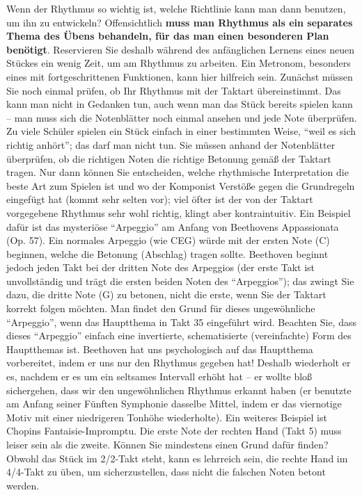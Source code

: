 Wenn der Rhythmus so wichtig ist, welche Richtlinie kann man dann benutzen, um ihn zu entwickeln?
Offensichtlich \textbf{muss man Rhythmus als ein separates Thema des Übens behandeln, für das man einen besonderen Plan benötigt}.
Reservieren Sie deshalb während des anfänglichen Lernens eines neuen Stückes ein wenig Zeit, um am Rhythmus zu arbeiten.
Ein Metronom, besonders eines mit fortgeschrittenen Funktionen, kann hier hilfreich sein.
Zunächst müssen Sie noch einmal prüfen, ob Ihr Rhythmus mit der Taktart übereinstimmt.
Das kann man nicht in Gedanken tun, auch wenn man das Stück bereits spielen kann -- man muss sich die Notenblätter noch einmal ansehen und jede Note überprüfen.
Zu viele Schüler spielen ein Stück einfach in einer bestimmten Weise, \enquote{weil es sich richtig anhört}; das darf man nicht tun.
Sie müssen anhand der Notenblätter überprüfen, ob die richtigen Noten die richtige Betonung gemäß der Taktart tragen.
Nur dann können Sie entscheiden, welche rhythmische Interpretation die beste Art zum Spielen ist und wo der Komponist Verstöße gegen die Grundregeln eingefügt hat (kommt sehr selten vor); viel öfter ist der von der Taktart vorgegebene Rhythmus sehr wohl richtig, klingt aber kontraintuitiv.
Ein Beispiel dafür ist das mysteriöse \enquote{Arpeggio} am Anfang von Beethovens Appassionata (Op. 57).
Ein normales Arpeggio (wie CEG) würde mit der ersten Note (C) beginnen, welche die Betonung (Abschlag) tragen sollte.
Beethoven beginnt jedoch jeden Takt bei der dritten Note des Arpeggios (der erste Takt ist unvollständig und trägt die ersten beiden Noten des \enquote{Arpeggios}); das zwingt Sie dazu, die dritte Note (G) zu betonen, nicht die erste, wenn Sie der Taktart korrekt folgen möchten.
Man findet den Grund für dieses ungewöhnliche \enquote{Arpeggio}, wenn das Hauptthema in Takt 35 eingeführt wird.
Beachten Sie, dass dieses \enquote{Arpeggio} einfach eine invertierte, schematisierte (vereinfachte) Form des Hauptthemas ist.
Beethoven hat uns psychologisch auf das Hauptthema vorbereitet, indem er uns nur den Rhythmus gegeben hat!
Deshalb wiederholt er es, nachdem er es um ein seltsames Intervall erhöht hat -- er wollte bloß sichergehen, dass wir den ungewöhnlichen Rhythmus erkannt haben (er benutzte am Anfang seiner Fünften Symphonie dasselbe Mittel, indem er das viernotige Motiv mit einer niedrigeren Tonhöhe wiederholte).
Ein weiteres Beispiel ist Chopins Fantaisie-Impromptu.
Die erste Note der rechten Hand (Takt 5) muss leiser sein als die zweite.
Können Sie mindestens einen Grund dafür finden?
Obwohl das Stück im 2/2-Takt steht, kann es lehrreich sein, die rechte Hand im 4/4-Takt zu üben, um sicherzustellen, dass nicht die falschen Noten betont werden.

